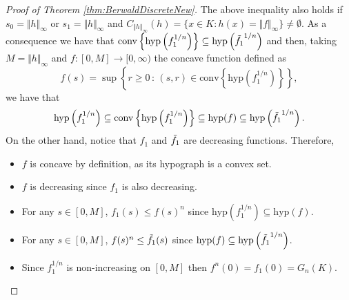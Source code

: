 \documentclass{amsart}
\theoremstyle{remark}
\theoremstyle{definition}
\numberwithin{equation}{section}
\begin{document}
\begin{proof}[Proof of Theorem \ref{thm:BerwaldDiscreteNew}]
The above inequality also holds if $s_0=\Vert h\Vert_\infty$ or $s_1=\Vert h\Vert_\infty$ and $C_{\Vert h\Vert_\infty}(h)=\{ x \in K: h(x) = \Vert f\Vert_\infty \}\neq\emptyset$. As a consequence we have that $\textrm{conv}\left\{\text{hyp} \left (f_1^{1/n} \right) \right\} \subseteq\textrm{hyp}\left(\Tilde{f_1}^{1/n} \right)$ and then, taking  $M=\Vert h\Vert_\infty$ and $f: [0,M] \to [0,\infty)$ the concave function defined as
$$
f(s)=\sup\left\{r\geq0\,:\,(s,r)\in\textrm{conv}\left\{\textrm{hyp}\left(f_1^{1/n}\right)\right\}\right\},
$$
we have that
$$
\text{hyp} \left (f_1^{1/n} \right) \subseteq\textrm{conv}\left \{ \textrm{hyp} \left (f_1^{1/n} \right) \right \}\subseteq\textrm{hyp}(f)\subseteq \textrm{hyp}\left(\Tilde{f_1}^{1/n} \right).
$$
On the other hand, notice that $f_1$ and $\Tilde{f_1}$ are decreasing functions. Therefore, %

\begin{itemize}
	\item $f$ is concave by definition, as its hypograph is a convex set.
	\item $f$ is decreasing since $f_1$ is also decreasing.
	\item For any $s \in[0,M]$, $f_1(s) \leq f(s)^n$ since $\text{hyp} \left (f_1^{1/n} \right) \subseteq \text{hyp} (f)$.
	\item For any $s \in[0,M]$, $f(s)^n \leq \Tilde{f_1}(s)$ since $\text{hyp} (f) \subseteq \textrm{hyp}\left(\Tilde{f_1}^{1/n} \right)$.
	\item Since $f_1^{1/n}$ is non-increasing on $[0, M]$ then $f^n(0)=f_1(0)=G_n(K)$.
\end{itemize}


\end{proof}
\end{document}

